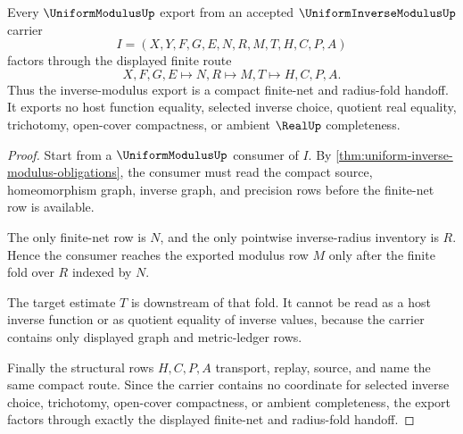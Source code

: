 \begin{theorem}
\label{thm:uniform-inverse-modulus-compact-handoff}
Every $\UniformModulusUp$ export from an accepted $\UniformInverseModulusUp$ carrier
$$
I=(X,Y,F,G,E,N,R,M,T,H,C,P,A)
$$
factors through the displayed finite route
$$
X,F,G,E \longmapsto N,R \longmapsto M,T \longmapsto H,C,P,A.
$$
Thus the inverse-modulus export is a compact finite-net and radius-fold handoff. It exports no host function equality, selected inverse choice, quotient real equality, trichotomy, open-cover compactness, or ambient $\RealUp$ completeness.
\end{theorem}
\begin{proof}
Start from a $\UniformModulusUp$ consumer of $I$. By \autoref{thm:uniform-inverse-modulus-obligations}, the consumer must read the compact source, homeomorphism graph, inverse graph, and precision rows before the finite-net row is available.

The only finite-net row is $N$, and the only pointwise inverse-radius inventory is $R$. Hence the consumer reaches the exported modulus row $M$ only after the finite fold over $R$ indexed by $N$.

The target estimate $T$ is downstream of that fold. It cannot be read as a host inverse function or as quotient equality of inverse values, because the carrier contains only displayed graph and metric-ledger rows.

Finally the structural rows $H,C,P,A$ transport, replay, source, and name the same compact route. Since the carrier contains no coordinate for selected inverse choice, trichotomy, open-cover compactness, or ambient completeness, the export factors through exactly the displayed finite-net and radius-fold handoff.
\end{proof}


\begin{closurestatus}{\UniformInverseModulusUp}
  \theoryclosure{\seedClosure}
  \formalstatus{\unformalizedV}
\end{closurestatus}
